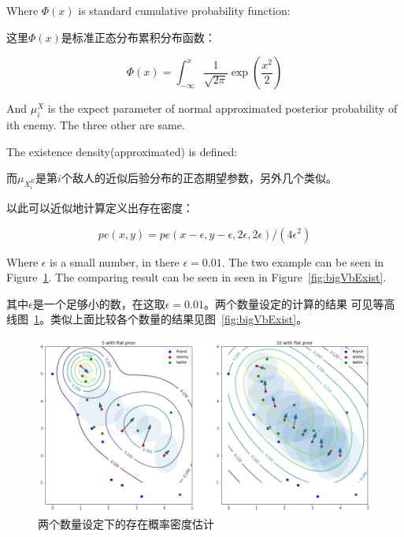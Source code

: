 \documentclass{article}
\begin{document}
Where $\Phi(x)$ is standard cumulative probability function:

这里$\Phi(x)$是标准正态分布累积分布函数：

$$
\Phi(x) = \int_{-\infty}^x \frac{1}{\sqrt{2\pi}} \exp\left(\frac{x^2}{2}\right)
$$

And $\mu^X_i$ is the expect parameter of normal approximated posterior probability of ith enemy.
The three other are same.

The existence density(approximated) is defined:

而$\mu_{X^E_i}$是第$i$个敌人的近似后验分布的正态期望参数，另外几个类似。

以此可以近似地计算定义出存在密度：

$$
pe(x,y) = pe(x-\epsilon,y-\epsilon,2\epsilon,2\epsilon)/(4 \epsilon^2)
$$

Where $\epsilon$ is a small number, in there $\epsilon=0.01$. 
The two example can be seen in Figure~\ref{fig:existDensity}. 
The comparing result can be seen in seen in Figure~\ref{fig:bigVbExist}.

其中$\epsilon$是一个足够小的数，在这取$\epsilon=0.01$。两个数量设定的计算的结果
可见等高线图~\ref{fig:existDensity}。类似上面比较各个数量的结果见图~\ref{fig:bigVbExist}。

\begin{figure}[ht]
\includegraphics[width=0.99\linewidth]{exist_density.png}
\caption{两个数量设定下的存在概率密度估计}
\label{fig:existDensity}
\end{figure}
\end{document}
